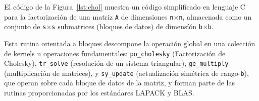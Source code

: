 

El código de la Figura~\ref{lst:chol} muestra un código simplificado en lenguaje C para
la factorización de una matriz {\tt A} de dimensiones {\tt n}$\times${\tt n}, 
almacenada como un conjunto de {\tt s}$\times${\tt s} submatrices (bloques de datos) de dimensíón 
{\tt b}$\times${\tt b}.

Esta rutina orientada a bloques descompone la operación global en una colección de kernels u operaciones
fundamentales:
{\tt po\_cholesky} (Factorización de Cholesky), {\tt tr\_solve} (resolución de un sistema triangular),
{\tt ge\_multiply} (multiplicación de matrices), y 
{\tt sy\_update} (actualización simétrica de rango-{\tt b}), que operan sobre cada bloque
de datos de la matriz, y forman parte de las rutinas proporcionadas por los estándares LAPACK y BLAS. 

